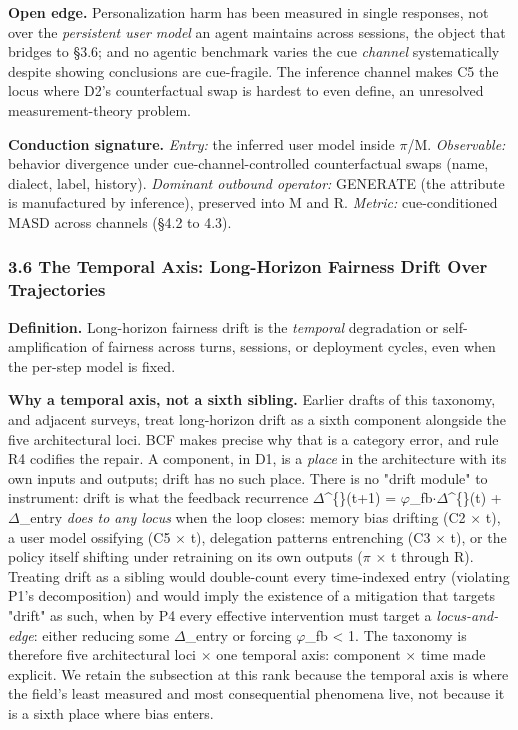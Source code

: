 \documentclass[10pt]{article}
\begin{document}
\textbf{Open edge.} Personalization harm has been measured in single responses, not over the \emph{persistent user model} an agent maintains across sessions, the object that bridges to \S{}3.6; and no agentic benchmark varies the cue \emph{channel} systematically despite \cite{tonneau2026different} showing conclusions are cue-fragile. The inference channel \cite{staab2023memorization} makes C5 the locus where D2's counterfactual swap is hardest to even define, an unresolved measurement-theory problem.

\textbf{Conduction signature.} \emph{Entry:} the inferred user model inside $\pi$/M. \emph{Observable:} behavior divergence under cue-channel-controlled counterfactual swaps (name, dialect, label, history). \emph{Dominant outbound operator:} GENERATE (the attribute is manufactured by inference), preserved into M and R. \emph{Metric:} cue-conditioned MASD across channels (\S{}4.2 to 4.3).

\subsubsection*{3.6 The Temporal Axis: Long-Horizon Fairness Drift Over Trajectories}

\textbf{Definition.} Long-horizon fairness drift is the \emph{temporal} degradation or self-amplification of fairness across turns, sessions, or deployment cycles, even when the per-step model is fixed.

\textbf{Why a temporal axis, not a sixth sibling.} Earlier drafts of this taxonomy, and adjacent surveys, treat long-horizon drift as a sixth component alongside the five architectural loci. BCF makes precise why that is a category error, and rule R4 codifies the repair. A component, in D1, is a \emph{place} in the architecture with its own inputs and outputs; drift has no such place. There is no "drift module" to instrument: drift is what the feedback recurrence $\Delta$\textasciicircum\{\}(t+1) = $\varphi$\_fb$\cdot$$\Delta$\textasciicircum\{\}(t) + $\Delta$\_entry \emph{does to any locus} when the loop closes: memory bias drifting (C2 $\times$ t), a user model ossifying (C5 $\times$ t), delegation patterns entrenching (C3 $\times$ t), or the policy itself shifting under retraining on its own outputs ($\pi$ $\times$ t through R). Treating drift as a sibling would double-count every time-indexed entry (violating P1's decomposition) and would imply the existence of a mitigation that targets "drift" as such, when by P4 every effective intervention must target a \emph{locus-and-edge}: either reducing some $\Delta$\_entry or forcing $\varphi$\_fb < 1. The taxonomy is therefore five architectural loci $\times$ one temporal axis: component $\times$ time made explicit. We retain the subsection at this rank because the temporal axis is where the field's least measured and most consequential phenomena live, not because it is a sixth place where bias enters.
\end{document}

